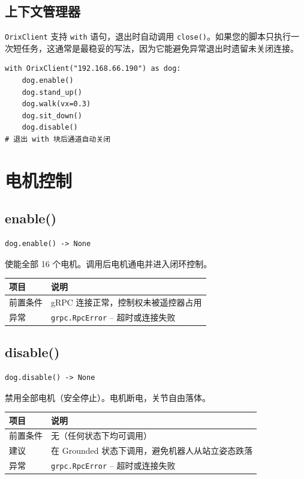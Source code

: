 \documentclass[a4paper,11pt,openany]{book}
\begin{document}
\subsection{上下文管理器}

\texttt{OrixClient} 支持 \texttt{with} 语句，退出时自动调用 \texttt{close()}。如果您的脚本只执行一次短任务，这通常是最稳妥的写法，因为它能避免异常退出时遗留未关闭连接。

\begin{lstlisting}[style=python]
with OrixClient("192.168.66.190") as dog:
    dog.enable()
    dog.stand_up()
    dog.walk(vx=0.3)
    dog.sit_down()
    dog.disable()
# 退出 with 块后通道自动关闭
\end{lstlisting}

\section{电机控制}

\subsection{enable()}

\begin{lstlisting}[style=python,numbers=none]
dog.enable() -> None
\end{lstlisting}

使能全部 16 个电机。调用后电机通电并进入闭环控制。

\begin{longtable}{ll}
\toprule
项目 & 说明 \\
\midrule
\endhead
前置条件 & gRPC 连接正常，控制权未被遥控器占用 \\
异常 & \texttt{grpc.RpcError} -- 超时或连接失败 \\
\bottomrule
\end{longtable}

\subsection{disable()}

\begin{lstlisting}[style=python,numbers=none]
dog.disable() -> None
\end{lstlisting}

禁用全部电机（安全停止）。电机断电，关节自由落体。

\begin{longtable}{ll}
\toprule
项目 & 说明 \\
\midrule
\endhead
前置条件 & 无（任何状态下均可调用） \\
建议 & 在 Grounded 状态下调用，避免机器人从站立姿态跌落 \\
异常 & \texttt{grpc.RpcError} -- 超时或连接失败 \\
\bottomrule
\end{longtable}
\end{document}
